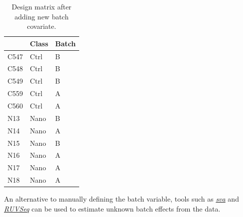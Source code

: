\documentclass[9pt,a4paper,]{extarticle}
\newenvironment{Shaded}{\begin{snugshade}}{\end{snugshade}}
\newcommand{\KeywordTok}[1]{\textcolor[rgb]{0.13,0.29,0.53}{\textbf{{#1}}}}
\newcommand{\DataTypeTok}[1]{\textcolor[rgb]{0.13,0.29,0.53}{{#1}}}
\newcommand{\DecValTok}[1]{\textcolor[rgb]{0.00,0.00,0.81}{{#1}}}
\newcommand{\StringTok}[1]{\textcolor[rgb]{0.31,0.60,0.02}{{#1}}}
\newcommand{\CommentTok}[1]{\textcolor[rgb]{0.56,0.35,0.01}{\textit{{#1}}}}
\newcommand{\OtherTok}[1]{\textcolor[rgb]{0.56,0.35,0.01}{{#1}}}
\newcommand{\NormalTok}[1]{{#1}}
\begin{document}
\begin{Shaded}
\end{Shaded}

\begin{table}[t]

\caption{\label{tab:batchVar}Design matrix after adding new batch covariate.}
\centering
\begin{tabular}{l|l|l}
\hline
  & Class & Batch\\
\hline
C547 & Ctrl & B\\
\hline
C548 & Ctrl & B\\
\hline
C549 & Ctrl & B\\
\hline
C559 & Ctrl & A\\
\hline
C560 & Ctrl & A\\
\hline
N13 & Nano & B\\
\hline
N14 & Nano & A\\
\hline
N15 & Nano & B\\
\hline
N16 & Nano & A\\
\hline
N17 & Nano & A\\
\hline
N18 & Nano & A\\
\hline
\end{tabular}
\end{table}

An alternative to manually defining the batch variable, tools such as \emph{\href{https://bioconductor.org/packages/3.8/sva}{sva}} and \emph{\href{https://bioconductor.org/packages/3.8/RUVSeq}{RUVSeq}} can be used to estimate unknown batch effects from the data.
\end{document}
